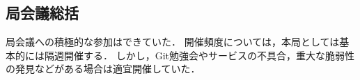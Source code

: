 \subsection*{局会議総括}


局会議への積極的な参加はできていた．
開催頻度については，本局としては基本的には隔週開催する．
しかし，Git勉強会やサービスの不具合，重大な脆弱性の発見などがある場合は適宜開催していた．
